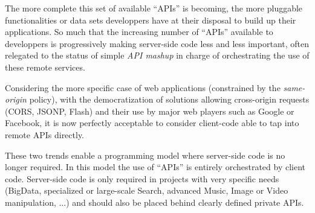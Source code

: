 The more complete this set of available ``APIs'' is becoming, the more
pluggable functionalities or data sets developpers have at their
disposal to build up their applications. So much that the increasing
number of ``APIs'' available to developpers is progressively making
server-side code less and less important, often relegated to the status
of simple \emph{API mashup} in charge of orchestrating the use of
these remote services. 

Considering the more specific case of web applications (constrained
by the \emph{same-origin} policy), with the democratization of
solutions allowing cross-origin requests (CORS, JSONP, Flash) and
their use by major web players such as Google or Facebook, it is now
perfectly acceptable to consider client-code able to tap into remote
APIs directly.

These two trends enable a programming model where server-side code is
no longer required. In this model the use of ``APIs'' is entirely
orchestrated by client code. Server-side code is only required in
projects with very specific needs (BigData, specialized or large-scale
Search, advanced Music, Image or Video manipulation, ...) and should
also be placed behind clearly defined private APIs.








